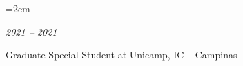 \documentclass[fontsize=11pt,paper=a4]{scrartcl}
\newcommand{\MarginText}[1]{\marginpar{\raggedleft\itshape\footnotesize#1}}
\newlength{\datebox}\settowidth{\datebox}{2020---2021}
\newcommand{\NewEntry}[3]{\noindent\hangindent=2em\hangafter=0%
  \parbox{\datebox}{\small \textit{#1}}\hspace{1em} {\small #2 #3}\vspace{.5em}}
\newcommand{\Description}[1]{\hangindent=2em\hangafter=0%
  \noindent\raggedright\footnotesize{#1}\par\flushleft\normalsize}
\begin{document}
\begin{cv}

  \NewEntry{2021 -- 2021}{Graduate Special Student at Unicamp, IC -- Campinas}
  

  \vspace{1em}












\end{cv}
\end{document}
